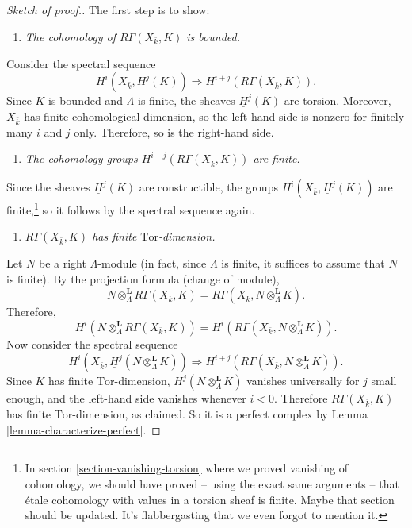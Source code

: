 \begin{proof}[Sketch of proof.]
The first step is to show:
\begin{enumerate}
\item[(1)]
{\it The cohomology of $R\Gamma(X_{\bar k}, K)$ is bounded.}
\end{enumerate}
Consider the spectral sequence
$$
H^i(X_{\bar k}, \underline H^j(K))
\Rightarrow
H^{i+j} (R\Gamma(X_{\bar k}, K)).
$$
Since $K$ is bounded and $\Lambda$ is finite, the sheaves $\underline H^j(K)$
are torsion. Moreover, $X_{\bar k}$ has finite cohomological dimension, so the
left-hand side is nonzero for finitely many $i$ and $j$ only. Therefore, so is
the right-hand side.
\begin{enumerate}
\item[(2)]
{\it The cohomology groups $H^{i+j} (R\Gamma(X_{\bar k}, K))$ are finite.}
\end{enumerate}
Since the sheaves $\underline H^j(K)$ are constructible, the groups
$H^i(X_{\bar k}, \underline H^j(K))$ are finite,\footnote{In section
\ref{section-vanishing-torsion} where we proved vanishing of
cohomology, we should have proved -- using the exact same arguments -- that
\'etale cohomology with values in a torsion sheaf is finite. Maybe that section
should be updated. It's flabbergasting that we even forgot to mention it.} so
it follows by the spectral sequence again.
\begin{enumerate}
\item[(3)]
{\it $R\Gamma(X_{\bar k}, K)$ has finite $\text{Tor}$-dimension.}
\end{enumerate}
Let $N$ be a right $\Lambda$-module (in fact, since $\Lambda$ is finite, it
suffices to assume that $N$ is finite). By the projection formula (change of
module),
$$
N\otimes^\mathbf{L}_\Lambda R \Gamma(X_{\bar k}, K) = R\Gamma(X_{\bar k},
N\otimes^\mathbf{L}_\Lambda K).
$$
Therefore,
$$
H^i (N\otimes^\mathbf{L}_\Lambda R\Gamma(X_{\bar k}, K)) = H^i(R\Gamma(X_{\bar
k}, N \otimes_{\Lambda}^\mathbf{L} K)).
$$
Now consider the spectral sequence
$$
H^i (X_{\bar k}, \underline H^j (N\otimes_{\Lambda}^\mathbf{L} K))
\Rightarrow
H^{i+j}(R\Gamma(X_{\bar k}, N \otimes_{\Lambda}^\mathbf{L} K)).
$$
Since $K$ has finite $\text{Tor}$-dimension, $\underline H^j
(N\otimes_{\Lambda}^\mathbf{L} K)$ vanishes universally for $j$ small enough,
and the left-hand side vanishes whenever $i < 0$. Therefore $R\Gamma(X_{\bar
k}, K)$ has finite $\text{Tor}$-dimension, as claimed. So it is a perfect
complex by Lemma \ref{lemma-characterize-perfect}.
\end{proof}





